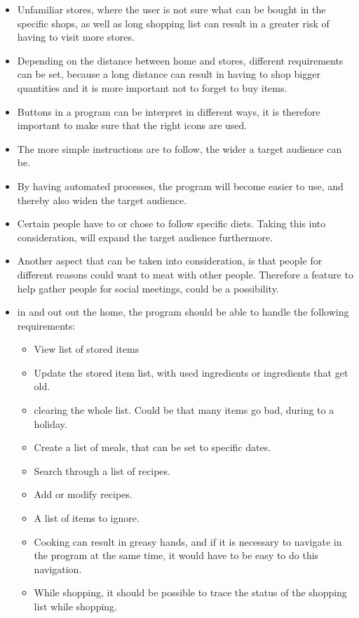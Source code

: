 \begin{itemize}
  \item Unfamiliar stores, where the user is not sure what can be bought in the specific shops, as well as long shopping list can result in a greater risk of having to visit more stores.
  \item Depending on the distance between home and stores, different requirements can be set, because a long distance can result in having to shop bigger quantities and it is more important not to forget to buy items.
  \item Buttons in a program can be interpret in different ways, it is therefore important to make sure that the right icons are used.
  \item The more simple instructions are to follow, the wider a target audience can be.
  \item By having automated processes, the program will become easier to use, and thereby also widen the target audience.
  \item Certain people have to or chose to follow specific diets. Taking this into consideration, will expand the target audience furthermore.
  \item Another aspect that can be taken into consideration, is that people for different reasons could want to meat with other people. Therefore a feature to help gather people for social meetings, could be a possibility.
  \item in and out out the home, the program should be able to handle the following requirements:
  \begin{itemize}
    \item View list of stored items
    \item Update the stored item list, with used ingredients or ingredients that get old.
    \item clearing the whole list. Could be that many items go bad, during to a holiday.
    \item Create a list of meals, that can be set to specific dates.
    \item Search through a list of recipes.
    \item Add or modify recipes.
    \item A list of items to ignore.
    \item Cooking can result in greasy hands, and if it is necessary to navigate in the program at the same time, it would have to be easy to do this navigation.
    \item While shopping, it should be possible to trace the status of the shopping list while shopping.

\end{itemize}
\end{itemize}
